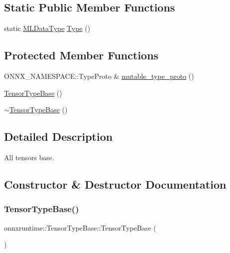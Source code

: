 \subsection*{Static Public Member Functions}
\begin{DoxyCompactItemize}
\item 
static \mbox{\hyperlink{namespaceonnxruntime_ad77d0a6e838ec7da5dc35fed5ee66b49}{M\+L\+Data\+Type}} \mbox{\hyperlink{classonnxruntime_1_1TensorTypeBase_ac2eca1e5e14e722fc4f764a242059042}{Type}} ()
\end{DoxyCompactItemize}
\subsection*{Protected Member Functions}
\begin{DoxyCompactItemize}
\item 
O\+N\+N\+X\+\_\+\+N\+A\+M\+E\+S\+P\+A\+C\+E\+::\+Type\+Proto \& \mbox{\hyperlink{classonnxruntime_1_1TensorTypeBase_a458c18e14ee5b23bf28497fad9cb01ba}{mutable\+\_\+type\+\_\+proto}} ()
\item 
\mbox{\hyperlink{classonnxruntime_1_1TensorTypeBase_a4b557a491b5dc14932079f60af8591f3}{Tensor\+Type\+Base}} ()
\item 
\mbox{\hyperlink{classonnxruntime_1_1TensorTypeBase_a3aad9fa2c99794f6e2eb970b4de706ee}{$\sim$\+Tensor\+Type\+Base}} ()
\end{DoxyCompactItemize}


\subsection{Detailed Description}
All tensors base. 

\subsection{Constructor \& Destructor Documentation}
\mbox{\label{classonnxruntime_1_1TensorTypeBase_a95f507377479db2346f591e3df63ba8b}} 
\subsubsection{\texorpdfstring{Tensor\+Type\+Base()}{TensorTypeBase()}\hspace{0.1cm}{\footnotesize\ttfamily [1/2]}}
{\footnotesize\ttfamily onnxruntime\+::\+Tensor\+Type\+Base\+::\+Tensor\+Type\+Base (\begin{DoxyParamCaption}\item[{const \mbox{\hyperlink{classonnxruntime_1_1TensorTypeBase}{Tensor\+Type\+Base}} \&}]{ }\end{DoxyParamCaption})\hspace{0.3cm}{\ttfamily [delete]}}

